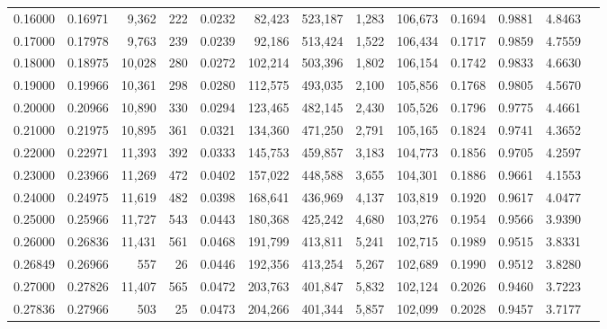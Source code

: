 \begin{tabular}{rrrrrrrrrrrrr}
0.16000 & 0.16971 &  9,362 &   222 &                                     0.0232 &  82,423 & 523,187 &   1,283 & 106,673 & 0.1694 & 0.9881 & 4.8463 \\
0.17000 & 0.17978 &  9,763 &   239 &                                     0.0239 &  92,186 & 513,424 &   1,522 & 106,434 & 0.1717 & 0.9859 & 4.7559 \\
0.18000 & 0.18975 & 10,028 &   280 &                                     0.0272 & 102,214 & 503,396 &   1,802 & 106,154 & 0.1742 & 0.9833 & 4.6630 \\
0.19000 & 0.19966 & 10,361 &   298 &                                     0.0280 & 112,575 & 493,035 &   2,100 & 105,856 & 0.1768 & 0.9805 & 4.5670 \\
0.20000 & 0.20966 & 10,890 &   330 &                                     0.0294 & 123,465 & 482,145 &   2,430 & 105,526 & 0.1796 & 0.9775 & 4.4661 \\
0.21000 & 0.21975 & 10,895 &   361 &                                     0.0321 & 134,360 & 471,250 &   2,791 & 105,165 & 0.1824 & 0.9741 & 4.3652 \\
0.22000 & 0.22971 & 11,393 &   392 &                                     0.0333 & 145,753 & 459,857 &   3,183 & 104,773 & 0.1856 & 0.9705 & 4.2597 \\
0.23000 & 0.23966 & 11,269 &   472 &                                     0.0402 & 157,022 & 448,588 &   3,655 & 104,301 & 0.1886 & 0.9661 & 4.1553 \\
0.24000 & 0.24975 & 11,619 &   482 &                                     0.0398 & 168,641 & 436,969 &   4,137 & 103,819 & 0.1920 & 0.9617 & 4.0477 \\
0.25000 & 0.25966 & 11,727 &   543 &                                     0.0443 & 180,368 & 425,242 &   4,680 & 103,276 & 0.1954 & 0.9566 & 3.9390 \\
0.26000 & 0.26836 & 11,431 &   561 &                                     0.0468 & 191,799 & 413,811 &   5,241 & 102,715 & 0.1989 & 0.9515 & 3.8331 \\
0.26849 & 0.26966 &    557 &    26 &                                     0.0446 & 192,356 & 413,254 &   5,267 & 102,689 & 0.1990 & 0.9512 & 3.8280 \\
0.27000 & 0.27826 & 11,407 &   565 &                                     0.0472 & 203,763 & 401,847 &   5,832 & 102,124 & 0.2026 & 0.9460 & 3.7223 \\
0.27836 & 0.27966 &    503 &    25 &                                     0.0473 & 204,266 & 401,344 &   5,857 & 102,099 & 0.2028 & 0.9457 & 3.7177 \\

\end{tabular}
